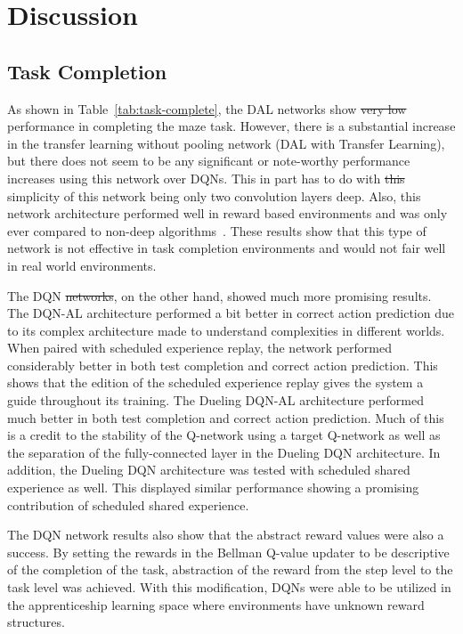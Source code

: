 \documentclass[12pt,american]{report}
\providecommand{\DIFaddtex}[1]{{\protect\color{blue}\uwave{#1}}} %
\providecommand{\DIFdeltex}[1]{{\protect\color{red}\sout{#1}}}                      %
\providecommand{\DIFaddbegin}{} %
\providecommand{\DIFaddend}{} %
\providecommand{\DIFdelbegin}{} %
\providecommand{\DIFdelend}{} %
\providecommand{\DIFadd}[1]{\texorpdfstring{\DIFaddtex{#1}}{#1}} %
\providecommand{\DIFdel}[1]{\texorpdfstring{\DIFdeltex{#1}}{}} %
\newcommand{\DIFscaledelfig}{0.5}
\newlength{\DIFdelgraphicswidth} %
\newlength{\DIFdelgraphicsheight} %
\newcommand{\DIFaddincludegraphics}[2][]{{\color{blue}\fbox{\DIFOincludegraphics[#1]{#2}}}} %
\newcommand{\DIFdelincludegraphics}[2][]{%
\sbox{\DIFdelgraphicsbox}{\DIFOincludegraphics[#1]{#2}}%
\settoboxwidth{\DIFdelgraphicswidth}{\DIFdelgraphicsbox} %
\settoboxtotalheight{\DIFdelgraphicsheight}{\DIFdelgraphicsbox} %
\scalebox{\DIFscaledelfig}{%
\parbox[b]{\DIFdelgraphicswidth}{\usebox{\DIFdelgraphicsbox}\\[-\baselineskip] \rule{\DIFdelgraphicswidth}{0em}}\llap{\resizebox{\DIFdelgraphicswidth}{\DIFdelgraphicsheight}{%
\setlength{\unitlength}{\DIFdelgraphicswidth}%
\begin{picture}(1,1)%
\thicklines\linethickness{2pt} %
{\color[rgb]{1,0,0}\put(0,0){\framebox(1,1){}}}%
{\color[rgb]{1,0,0}\put(0,0){\line( 1,1){1}}}%
{\color[rgb]{1,0,0}\put(0,1){\line(1,-1){1}}}%
\end{picture}%
}\hspace*{3pt}}} %
} %
\DeclareRobustCommand{\DIFaddbegin}{\DIFOaddbegin \let\includegraphics\DIFaddincludegraphics} %
\DeclareRobustCommand{\DIFaddend}{\DIFOaddend \let\includegraphics\DIFOincludegraphics} %
\DeclareRobustCommand{\DIFdelbegin}{\DIFOdelbegin \let\includegraphics\DIFdelincludegraphics} %
\DeclareRobustCommand{\DIFdelend}{\DIFOaddend \let\includegraphics\DIFOincludegraphics} %
\begin{document}
\section{Discussion}

\subsection{Task Completion}
As shown in Table~\ref{tab:task-complete}, the DAL networks show \DIFdelbegin \DIFdel{very low }\DIFdelend \DIFaddbegin \DIFadd{poor }\DIFaddend performance in completing the maze task.  However, there is a substantial increase in the transfer learning without pooling network (DAL with Transfer Learning), but there does not seem to be any significant or note-worthy performance increases using this network over DQNs.  This in part has to do with \DIFdelbegin \DIFdel{this }\DIFdelend \DIFaddbegin \DIFadd{the }\DIFaddend simplicity of this network being only two convolution layers deep.  Also, this network architecture performed well in reward based environments and was only ever compared to non-deep algorithms~\cite{markovikj2014deep}.  These results show that this type of network is not effective in task completion environments and would not fair well in real world environments.  

The DQN \DIFdelbegin \DIFdel{networks}\DIFdelend \DIFaddbegin \DIFadd{architectures}\DIFaddend , on the other hand, showed much more promising results. The DQN-AL architecture performed a bit better in correct action prediction due to its complex architecture made to understand complexities in different worlds. When paired with scheduled experience replay, the network performed considerably better in both test completion and correct action prediction.  This shows that the edition of the scheduled experience replay gives the system a guide throughout its training.  The Dueling DQN-AL architecture performed much better in both test completion and correct action prediction.  Much of this is a credit to the stability of the Q-network using a target Q-network as well as the separation of the fully-connected layer in the Dueling DQN architecture.  In addition, the Dueling DQN architecture was tested with scheduled shared experience as well.  This displayed similar performance showing a promising contribution of scheduled shared experience. 

The DQN network results also show that the abstract reward values were also a success. By setting the rewards in the Bellman Q-value updater to be descriptive of the completion of the task, abstraction of the reward from the step level to the task level was achieved.  With this modification, DQNs were able to be utilized in the apprenticeship learning space where environments have unknown reward structures. 
\end{document}
